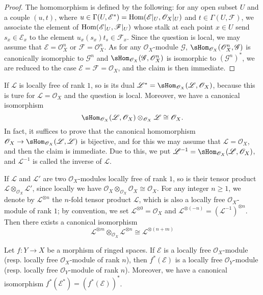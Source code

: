 \begin{proof}
The homomorphism is defined by the following: for any open subset $U$ and a couple $(u,t)$, where $u\in\Gamma(U,\mathscr{E}^*)=\mathrm{Hom}(\mathscr{E}|_U,\mathscr{O}_X|_U)$ and $t\in\Gamma(U,\mathscr{F})$, we associate the element of $\mathrm{Hom}(\mathscr{E}|_U,\mathscr{F}|_U)$ whose stalk at each point $x\in U$ send $s_x\in\mathscr{E}_x$ to the element $u_x(s_x)t_s\in\mathscr{F}_x$. Since the question is local, we may assume that $\mathscr{E}=\mathscr{O}_X^n$ or $\mathscr{F}=\mathscr{O}_X^n$. As for any $\mathscr{O}_X$-module $\mathscr{G}$, $\sHom_{\mathscr{O}_X}(\mathscr{O}_X^n,\mathscr{G})$ is canonically isomorphic to $\mathscr{G}^n$ and $\sHom_{\mathscr{O}_X}(\mathscr{G},\mathscr{O}_X^n)$ is isomorphic to $(\mathscr{G}^n)^*$, we are reduced to the case $\mathscr{E}=\mathscr{F}=\mathscr{O}_X$, and the claim is then immediate.
\end{proof}
If $\mathscr{L}$ is locally free of rank $1$, so is its dual $\mathscr{L}^*=\sHom_{\mathscr{O}_X}(\mathscr{L},\mathscr{O}_X)$, because this is ture for $\mathscr{L}=\mathscr{O}_X$ and the question is local. Moreover, we have a canonical isomorphism
\[\sHom_{\mathscr{O}_X}(\mathscr{L},\mathscr{O}_X)\otimes_{\mathscr{O}_X}\mathscr{L}\cong\mathscr{O}_{X}.\]
In fact, it suffices to prove that the canonical homomorphism $\mathscr{O}_X\to\sHom_{\mathscr{O}_X}(\mathscr{L},\mathscr{L})$ is bijective, and for this we may assume that $\mathscr{L}=\mathscr{O}_X$, and then the claim is immediate. Due to this, we put $\mathscr{L}^{-1}=\sHom_{\mathscr{O}_X}(\mathscr{L},\mathscr{O}_X)$, and $\mathscr{L}^{-1}$ is called the inverse of $\mathscr{L}$.\par
If $\mathscr{L}$ and $\mathscr{L}'$ are two $\mathscr{O}_X$-modules locally free of rank $1$, so is their tensor product $\mathscr{L}\otimes_{\mathscr{O}_X}\mathscr{L}'$, since locally we have $\mathscr{O}_X\otimes_{\mathscr{O}_X}\mathscr{O}_X\cong\mathscr{O}_X$. For any integer $n\geq 1$, we denote by $\mathscr{L}^{\otimes n}$ the $n$-fold tensor product $\mathscr{L}$, which is also a locally free $\mathscr{O}_X$-module of rank $1$; by convention, we set $\mathscr{L}^{\otimes 0}=\mathscr{O}_X$ and $\mathscr{L}^{\otimes(-n)}=(\mathscr{L}^{-1})^{\otimes n}$. Then there exists a canonical isomorphism
\[\mathscr{L}^{\otimes m}\otimes_{\mathscr{O}_X}\mathscr{L}^{\otimes n}\cong\mathscr{L}^{\otimes(n+m)}\]
\begin{proposition}\label{sheaf of module local free inverse image}
Let $f:Y\to X$ be a morphism of ringed spaces. If $\mathscr{E}$ is a locally free $\mathscr{O}_X$-module (resp. locally free $\mathscr{O}_X$-module of rank $n$), then $f^*(\mathscr{E})$ is a locally free $\mathscr{O}_Y$-module (resp. locally free $\mathscr{O}_Y$-module of rank $n$). Moreover, we have a canonical isomorphism $f^*(\mathscr{E}^*)=(f^*(\mathscr{E}))^*$.
\end{proposition}
